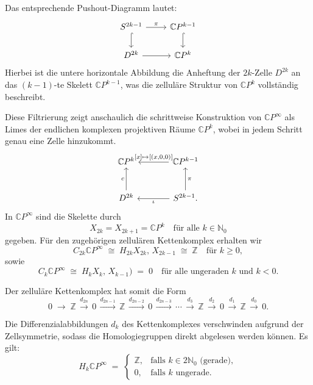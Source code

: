 \documentclass[12pt]{article}
\numberwithin{conj}{section}
\begin{document}
    Das entsprechende Pushout-Diagramm lautet:
    \[
        \begin{tikzcd}
            S^{2k-1} \arrow[r, "\pi"] \arrow[d, hook] & \mathbb{C}P^{k-1} \arrow[d, hook]
            \\ D^{2k} \arrow[r] & \mathbb{C}P^k
        \end{tikzcd}
    \]
    Hierbei ist die untere horizontale Abbildung die Anheftung der $2k$-Zelle
    $D^{2k}$ an das $(k-1)$-te Skelett $\mathbb{C}P^{k-1}$, was die zelluläre Struktur
    von $\mathbb{C}P^{k}$ vollständig beschreibt.

    Diese Filtrierung zeigt anschaulich die schrittweise Konstruktion von $\mathbb{C}
    P^{\infty}$ als Limes der endlichen komplexen projektiven Räume $\mathbb{C}P^{k}$,
    wobei in jedem Schritt genau eine Zelle hinzukommt.
    \[
        \begin{tikzcd}
            [sep=large] {\mathbb{C}P^k} & {\mathbb{C}P^{k-1}} \\ {D^{2k}} & {S^{2k-1}}.
            \arrow["{[x] \mapsto[(x,0,0)]}"', from=1-2, to=1-1] \arrow["c", from=2-1,
            to=1-1] \arrow["\pi"', from=2-2, to=1-2] \arrow["\iota", from=2-2, to=2-1]
        \end{tikzcd}
    \]
    In $\mathbb{C}P^{\infty}$ sind die Skelette durch
    \[
        X_{2k}= X_{2k+1}= \mathbb{C}P^{k} \quad \text{für alle }k \in \mathbb{N}_{0}
    \]
    gegeben. Für den zugehörigen zellulären Kettenkomplex erhalten wir
    \[
        C_{2k} \mathbb{C}P^{\infty}  \;\cong\; H_{2k} X_{2k},\,X_{2k-1}
          \;\cong\; \mathbb{Z}\quad \text{für }k \geq 0,
    \]
    sowie
    \[
        C_{k} \mathbb{C}P^{\infty}  \;\cong\; H_{k} X_{k},\,X_{k-1}\bigr
        ) \;=\; 0 \quad \text{für alle ungeraden }k \text{ und }k < 0.
    \]

    Der zelluläre Kettenkomplex hat somit die Form
    \[
        0 \;\longrightarrow\; \mathbb{Z}\,\xrightarrow{d_{2n}}\, 0 \,\xrightarrow{d_{2n-1}}
        \, \mathbb{Z}\,\xrightarrow{d_{2n-2}}\, 0 \,\xrightarrow{d_{2n-3}}\, \cdots \,
        \xrightarrow{d_3}\, \mathbb{Z}\,\xrightarrow{d_2}\, 0 \,\xrightarrow{d_1}\, \mathbb{Z}
        \,\xrightarrow{d_0}\, 0.
    \]

    Die Differenzialabbildungen $d_{k}$ des Kettenkomplexes verschwinden aufgrund
    der Zellsymmetrie, sodass die Homologiegruppen direkt abgelesen werden können.
    Es gilt:
    \[
        H_{k} \mathbb{C}P^{\infty}  \;=\;
        \begin{cases}
            \mathbb{Z}, & \text{falls }k \in 2\mathbb{N}_{0} \text{ (gerade)}, \\
            0,          & \text{falls }k \text{ ungerade}.
        \end{cases}
    \]
\end{document}
